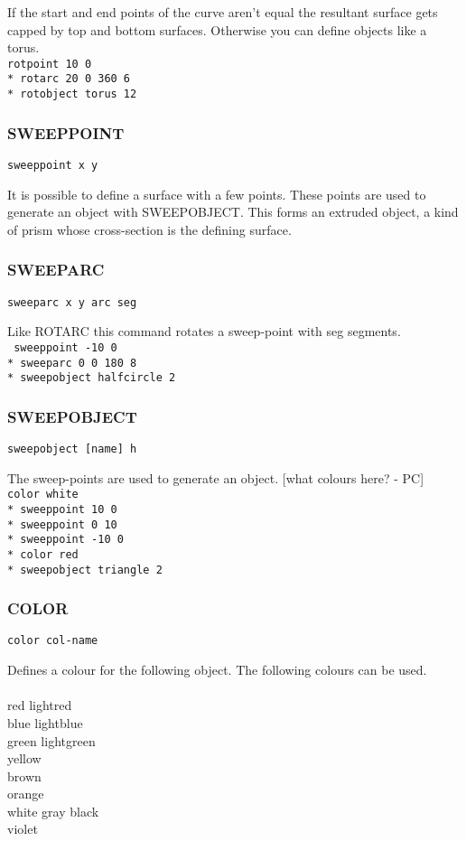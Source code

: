 If the start and end points of the curve aren't equal the resultant surface
gets capped by top and bottom surfaces. Otherwise you can define objects like
a torus.
\tt{
\\
rotpoint 10 0\\*
rotarc 20 0 360 6\\*
rotobject torus 12
}

\subsubsection{SWEEPPOINT}
\tt{sweeppoint x y}

It is possible to define a surface with a few points. These points are
used to generate an object with SWEEPOBJECT. This forms an extruded object,
a kind of prism whose cross-section is the defining surface.

\subsubsection{SWEEPARC}
\tt{sweeparc x y arc seg}

Like ROTARC this command rotates a sweep-point with seg segments.\\
\tt{
sweeppoint -10 0\\*
sweeparc 0 0 180 8\\*
sweepobject halfcircle 2
}

\subsubsection{SWEEPOBJECT}
\tt{sweepobject [name] h}

The sweep-points are used to generate an object. [what colours here? - PC]
\tt{
\\
color white\\*
sweeppoint 10 0\\*
sweeppoint 0 10\\*
sweeppoint -10 0\\*
color red\\*
sweepobject triangle 2
}

\subsubsection{COLOR}
\tt{color col-name}

Defines a colour for the following object. The following colours can be
used.\\
\\
red lightred\\
blue lightblue\\
green lightgreen\\
yellow\\
brown\\
orange\\
white gray black\\
violet

